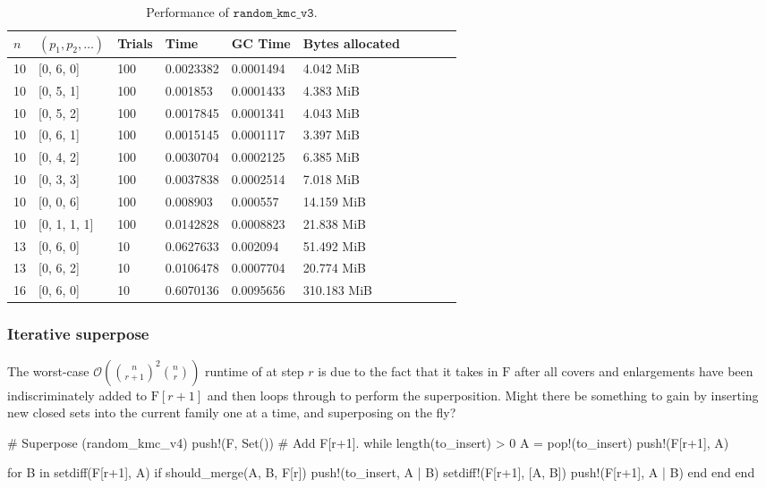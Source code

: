 \begin{table*}[ht!]
  \centering
  \caption{Performance of $\texttt{random\_kmc\_v3}$.}
  \label{tab:perf_v3}
  \begin{threeparttable}
    \begin{tabular}{llllllllll}
      \toprule
      $n$ & $(p_1, p_2, \ldots)$ & Trials & Time  & GC Time & Bytes allocated \\
      \midrule
      10 & [0, 6, 0] & 100 & 0.0023382 & 0.0001494 & 4.042 MiB \\
      10 & [0, 5, 1] & 100 & 0.001853 & 0.0001433 & 4.383 MiB \\
      10 & [0, 5, 2] & 100 & 0.0017845 & 0.0001341 & 4.043 MiB \\
      10 & [0, 6, 1] & 100 & 0.0015145 & 0.0001117 & 3.397 MiB \\
      10 & [0, 4, 2] & 100 & 0.0030704 & 0.0002125 & 6.385 MiB \\
      10 & [0, 3, 3] & 100 & 0.0037838 & 0.0002514 & 7.018 MiB \\
      10 & [0, 0, 6] & 100 & 0.008903 & 0.000557 & 14.159 MiB \\
      10 & [0, 1, 1, 1] & 100 & 0.0142828 & 0.0008823 & 21.838 MiB \\
      13 & [0, 6, 0] & 10 & 0.0627633 & 0.002094 & 51.492 MiB \\
      13 & [0, 6, 2] & 10 & 0.0106478 & 0.0007704 & 20.774 MiB \\
      16 & [0, 6, 0] & 10 & 0.6070136 & 0.0095656 & 310.183 MiB \\
      \bottomrule
    \end{tabular}
  \end{threeparttable}
\end{table*}


\subsubsection{Iterative superpose}
The worst-case $\mathcal{O}({\binom{n}{r+1}}^2{\binom{n}{r}})$ runtime of  at step $r$ is due to the fact that it takes in $\mathrm{F}$ after all covers and enlargements have been indiscriminately added to $\mathrm{F}[r+1]$ and then loops through to perform the superposition. Might there be something to gain by inserting new closed sets into the current family one at a time, and superposing on the fly?
\pagebreak
\begin{jllisting}
  # Superpose (random_kmc_v4)
  push!(F, Set()) # Add F[r+1].
  while length(to_insert) > 0
    A = pop!(to_insert)
    push!(F[r+1], A)

    for B in setdiff(F[r+1], A)
      if should_merge(A, B, F[r])
        push!(to_insert, A | B)
        setdiff!(F[r+1], [A, B])
        push!(F[r+1], A | B)
      end
    end
  end
\end{jllisting}

